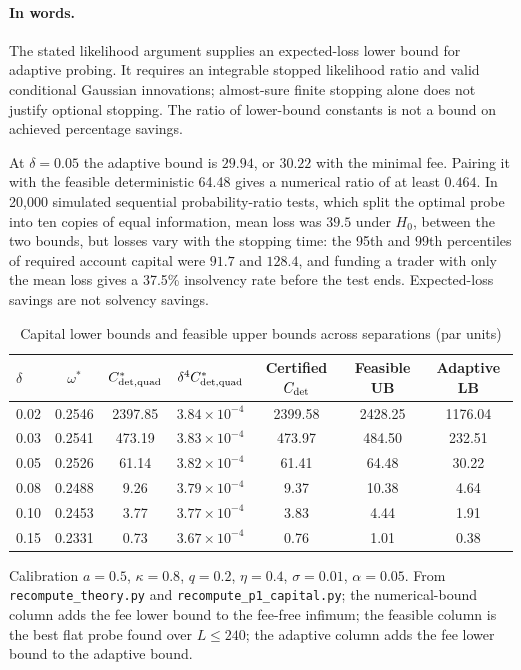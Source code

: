 \paragraph{In words.} The stated likelihood argument supplies an expected-loss lower bound for adaptive probing. It requires an integrable stopped likelihood ratio and valid conditional Gaussian innovations; almost-sure finite stopping alone does not justify optional stopping. The ratio of lower-bound constants is not a bound on achieved percentage savings.

At $\delta=0.05$ the adaptive bound is $29.94$, or $30.22$ with the minimal fee. Pairing it with the feasible deterministic 64.48 gives a numerical ratio of at least $0.464$. In 20{,}000 simulated sequential probability-ratio tests, which split the optimal probe into ten copies of equal information, mean loss was $39.5$ under $H_0$, between the two bounds, but losses vary with the stopping time: the 95th and 99th percentiles of required account capital were $91.7$ and $128.4$, and funding a trader with only the mean loss gives a 37.5\% insolvency rate before the test ends. Expected-loss savings are not solvency savings.

\begin{table}[t]\centering\small
\begin{threeparttable}
\caption{Capital lower bounds and feasible upper bounds across separations (par units)}\label{tab:capbounds}
\begin{tabular}{lcccccc}
\toprule
$\delta$ & $\omega^*$ & $C^*_{\rm det,quad}$ & $\delta^4C^*_{\rm det,quad}$ & Certified $C_{\rm det}$ & Feasible UB & Adaptive LB\\
\midrule
0.02 & 0.2546 & 2397.85 & $3.84\times10^{-4}$ & 2399.58 & 2428.25 & 1176.04\\
0.03 & 0.2541 & 473.19 & $3.83\times10^{-4}$ & 473.97 & 484.50 & 232.51\\
0.05 & 0.2526 & 61.14 & $3.82\times10^{-4}$ & 61.41 & 64.48 & 30.22\\
0.08 & 0.2488 & 9.26 & $3.79\times10^{-4}$ & 9.37 & 10.38 & 4.64\\
0.10 & 0.2453 & 3.77 & $3.77\times10^{-4}$ & 3.83 & 4.44 & 1.91\\
0.15 & 0.2331 & 0.73 & $3.67\times10^{-4}$ & 0.76 & 1.01 & 0.38\\
\bottomrule
\end{tabular}
\begin{tablenotes}\footnotesize\item Calibration $a=0.5$, $\kappa=0.8$, $q=0.2$, $\eta=0.4$, $\sigma=0.01$, $\alpha=0.05$. From \texttt{recompute\_theory.py} and \texttt{recompute\_p1\_capital.py}; the numerical-bound column adds the fee lower bound to the fee-free infimum; the feasible column is the best flat probe found over $L\le240$; the adaptive column adds the fee lower bound to the adaptive bound.\end{tablenotes}
\end{threeparttable}
\end{table}

